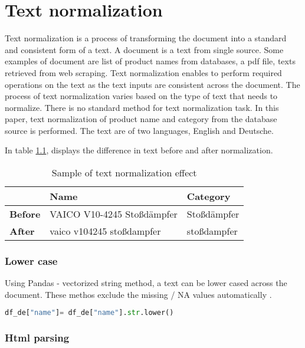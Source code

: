 \chapter{Text normalization} \label{text_normalization}

Text normalization is a process of transforming the document into a standard and consistent form of a text. A document is a text from single source. Some examples of document are list of product names from databases, a pdf file, texts retrieved from web scraping. Text normalization enables to perform required operations on the text as the text inputs are consistent across the document. The process of text normalization varies based on the type of text that needs to normalize. There is no standard method for text normalization task. In this paper, text normalization of product name and category from the database source is performed. The text are of two languages, English and Deutsche.

In table \ref{table:TN}, displays the difference in text before and after normalization. 

\begin{table}[h]
      \caption{Sample of text normalization effect}
      \centering
      \label{table:TN}
\begin{tabular}{lll}
      \toprule 
                  &\textbf{Name} & \textbf{Category} \\ 
      \midrule
      \textbf{Before}&VAICO V10-4245 Stoßdämpfer & Stoßdämpfer \\
      \textbf{After}&vaico v104245 stoßdampfer & stoßdampfer \\
      
      \bottomrule
\end{tabular}
\end{table}

\subsection{Lower case}

Using Pandas - vectorized string method, a text can be lower cased across the document. These methos exclude the missing  / NA values automatically \parencite{mckinney-proc-scipy-2010}.

\begin{lstlisting}[language=Python]
      df_de["name"]= df_de["name"].str.lower()
\end{lstlisting}

\subsection{Html parsing}

